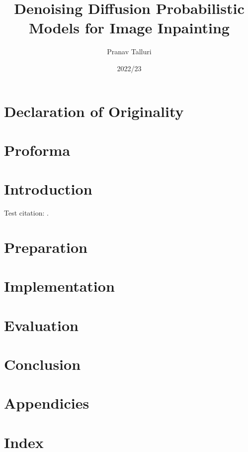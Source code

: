 \documentclass{article}
\title{Denoising Diffusion Probabilistic Models for Image Inpainting}
\author{Pranav Talluri}
\date{2022/23}
\begin{document}
\maketitle
\newpage
\section*{Declaration of Originality}
\newpage
\section*{Proforma}
\newpage
\tableofcontents
\newpage
\section{Introduction}
Test citation: \cite{Ho-2020}.
\newpage
\section{Preparation}
\newpage
\section{Implementation}
\newpage
\section{Evaluation}
\newpage
\section{Conclusion}
\newpage
\printbibliography
\newpage
\section*{Appendicies}
\newpage
\section*{Index}
\newpage
\end{document}
